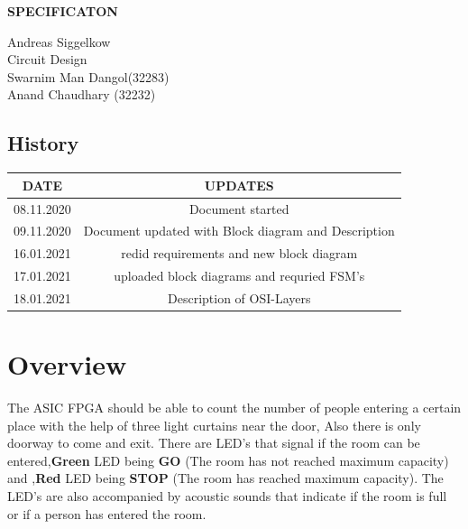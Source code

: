\documentclass{article}
\begin{document}
\begin{center}
       
    \Huge
    \textbf{SPECIFICATON} \\
     \huge
     \vspace{2.5cm}

     \vspace{0.5cm}
    Andreas Siggelkow\\
    Circuit Design \\
    \vspace{2.5cm}
    \large
    Swarnim Man Dangol(32283)\\
    Anand Chaudhary (32232)    \\
    \vspace{0.5cm}
  
    
\end{center}
\newpage
\tableofcontents


\newpage
  \begin{center}
    \section{History}

         \begin{tabular}{c|c }
         \hline
        DATE   & UPDATES \\
         \hline
        08.11.2020 & Document started \\
         \hline
        09.11.2020 & Document updated with Block diagram and Description \\
        
         \hline
       16.01.2021 & redid requirements and new block diagram\\
        \hline
        17.01.2021 & uploaded block diagrams and requried FSM's\\
        \hline
        18.01.2021 & Description of OSI-Layers \\
        \hline
         
\end{tabular}
\end{center}
\newpage
\section{Overview}

    The ASIC FPGA should be able to count the number of people entering a certain place with the help of three light curtains near the door, Also there is only doorway to come and exit. There are LED's that signal if the room can be entered,\textbf{Green} LED being \textbf{GO} (The room has not reached maximum capacity) and ,\textbf{Red} LED being \textbf{STOP} (The room has reached maximum capacity). The LED's are also accompanied by acoustic sounds that indicate if the room is full or if a person  has entered the room.
\vspace{2.5 cm}
\end{document}
